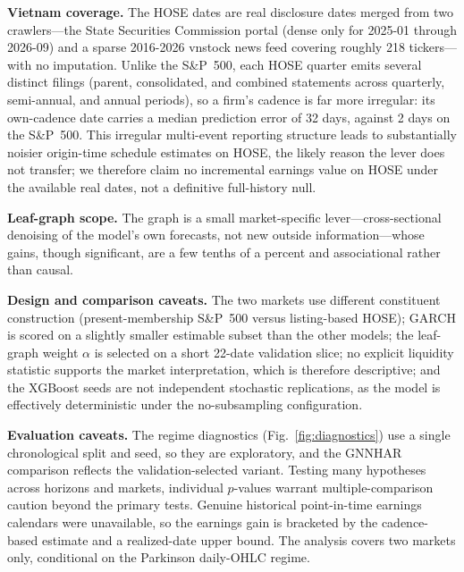 \documentclass[runningheads,a4paper]{llncs}
\begin{document}
\noindent\textbf{Vietnam coverage.} The HOSE dates are real disclosure dates merged from two crawlers---the
State Securities Commission portal (dense only for 2025-01 through 2026-09) and a sparse 2016-2026 vnstock
news feed covering roughly 218 tickers---with no imputation. Unlike the S\&P~500, each HOSE quarter emits
several distinct filings (parent, consolidated, and combined statements across quarterly, semi-annual, and
annual periods), so a firm's cadence is far more irregular: its own-cadence date carries a median
prediction error of 32 days, against 2 days on the S\&P~500. This irregular multi-event reporting structure
leads to substantially noisier origin-time schedule estimates on HOSE, the likely reason the lever does not
transfer; we therefore claim no incremental earnings value on HOSE under the available real dates, not a
definitive full-history null.

\noindent\textbf{Leaf-graph scope.} The graph is a small market-specific lever---cross-sectional denoising
of the model's own forecasts, not new outside information---whose gains, though significant, are a few
tenths of a percent and associational rather than causal.

\noindent\textbf{Design and comparison caveats.} The two markets use different constituent construction
(present-membership S\&P~500 versus listing-based HOSE); GARCH is scored on a slightly smaller estimable
subset than the other models; the leaf-graph weight $\alpha$ is selected on a short 22-date validation
slice; no explicit liquidity statistic supports the market interpretation, which is therefore descriptive;
and the XGBoost seeds are not independent stochastic replications, as the model is effectively deterministic
under the no-subsampling configuration.

\noindent\textbf{Evaluation caveats.} The regime diagnostics (Fig.~\ref{fig:diagnostics}) use a single
chronological split and seed, so they are exploratory, and the GNNHAR comparison reflects the
validation-selected variant. Testing many hypotheses across horizons and markets, individual $p$-values
warrant multiple-comparison caution beyond the primary tests. Genuine historical point-in-time earnings
calendars were unavailable, so the earnings gain is bracketed by the cadence-based estimate and a
realized-date upper bound. The analysis covers two markets only, conditional on the Parkinson daily-OHLC
regime.
\end{document}
